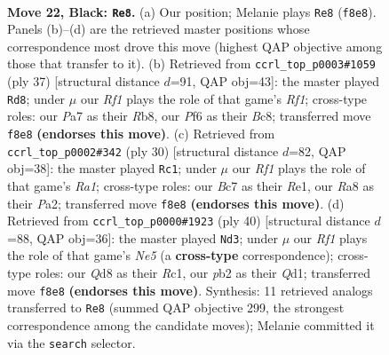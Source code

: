 \documentclass[11pt]{article}
\begin{document}
\clearpage

\begin{figure}[p]\centering
\begin{subfigure}{0.46\textwidth}\centering
\resizebox{\linewidth}{!}{%
\newchessgame
\chessboard[
  setfen={r1bq1rk1/ppb4p/5ppB/3p4/7P/1B1P1NPn/PPP2PK1/R2QR3 b - - 4 22},
  showmover=false,
  pgfstyle=straightmove, color=movearrow, markmove={f8-e8}
]}
\caption{}
\end{subfigure}\hfill
\begin{subfigure}{0.46\textwidth}\centering
\resizebox{\linewidth}{!}{%
\newchessgame
\chessboard[
  setfen={1rb2rk1/2q1bppp/2p5/1p2p3/4Pn2/1B2B2P/1PPN1PP1/R2QR1K1 b - - 0 19},
  showmover=false,
  pgfstyle=straightmove, color=movearrow, markmove={f8-d8}
]}
\caption{}
\end{subfigure}
\\[4pt]
\begin{subfigure}{0.46\textwidth}\centering
\resizebox{\linewidth}{!}{%
\newchessgame
\chessboard[
  setfen={rn2r1k1/pp1q1p1p/3p2p1/2pP1bB1/2P3P1/7P/Pb1NBP2/R2QR1K1 w - - 0 16},
  showmover=false,
  pgfstyle=straightmove, color=movearrow, markmove={a1-c1}
]}
\caption{}
\end{subfigure}\hfill
\begin{subfigure}{0.46\textwidth}\centering
\resizebox{\linewidth}{!}{%
\newchessgame
\chessboard[
  setfen={3r1nk1/1bq1r1pp/1p2pp2/p3N3/PbPP4/7P/1B2RPP1/1BRQ2K1 w - - 0 21},
  showmover=false,
  pgfstyle=straightmove, color=movearrow, markmove={e5-d3}
]}
\caption{}
\end{subfigure}
\caption{\textbf{Move 22, Black: \texttt{Re8}.} (a) Our position; Melanie plays \texttt{Re8} (\texttt{f8e8}). Panels (b)--(d) are the retrieved master positions whose correspondence most drove this move (highest QAP objective among those that transfer to it). (b) Retrieved from \texttt{ccrl\_top\_p0003\#1059} (ply 37) [structural distance $d$=91, QAP obj=43]: the master played \texttt{Rd8}; under $\mu$ our \emph{Rf1} plays the role of that game's \emph{Rf1}; cross-type roles: our \emph{P}a7 as their \emph{R}b8, our \emph{P}f6 as their \emph{B}c8; transferred move \texttt{f8e8} \textbf{(endorses this move)}. (c) Retrieved from \texttt{ccrl\_top\_p0002\#342} (ply 30) [structural distance $d$=82, QAP obj=38]: the master played \texttt{Rc1}; under $\mu$ our \emph{Rf1} plays the role of that game's \emph{Ra1}; cross-type roles: our \emph{B}c7 as their \emph{R}e1, our \emph{R}a8 as their \emph{P}a2; transferred move \texttt{f8e8} \textbf{(endorses this move)}. (d) Retrieved from \texttt{ccrl\_top\_p0000\#1923} (ply 40) [structural distance $d$=88, QAP obj=36]: the master played \texttt{Nd3}; under $\mu$ our \emph{Rf1} plays the role of that game's \emph{Ne5} (a \textbf{cross-type} correspondence); cross-type roles: our \emph{Q}d8 as their \emph{R}c1, our \emph{p}b2 as their \emph{Q}d1; transferred move \texttt{f8e8} \textbf{(endorses this move)}. Synthesis: 11 retrieved analogs transferred to \texttt{Re8} (summed QAP objective 299, the strongest correspondence among the candidate moves); Melanie committed it via the \texttt{search} selector.}
\label{fig:thought-m43}
\end{figure}
\end{document}
